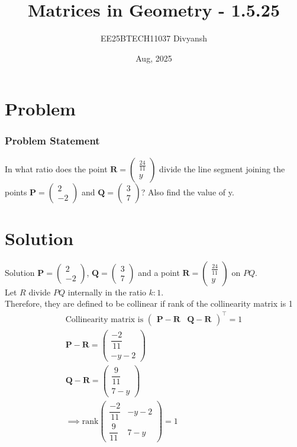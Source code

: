 \documentclass{beamer}
\title{Matrices in Geometry - 1.5.25}
\author{EE25BTECH11037  Divyansh}
\date{Aug, 2025}
\let\vec\mathbf
\theoremstyle{remark}
\newcommand{\myvec}[1]{\ensuremath{\begin{pmatrix}#1\end{pmatrix}}}
\begin{document}
\maketitle


\begin{frame}
\tableofcontents
\end{frame}
\section{Problem}
\begin{frame}
\frametitle{Problem Statement}
In what ratio does the point $\vec{R}=\myvec{\frac{24}{11} \\ y}$ divide the line segment joining the points $\vec{P}=\myvec{2 \\ -2}$ and $\vec{Q}=\myvec{3 \\ 7}$? Also find the value of y.
\end{frame}

\section{Solution}
\begin{frame}{Solution}
   $\vec{P}=\myvec{2\\-2}$, $\vec{Q}=\myvec{3\\7}$ and a point $\vec{R}=  \myvec{\frac{24}{11} \\ y}$ on $PQ$. \\
   Let $R$ divide $PQ$ internally in the ratio $k:1$.\\
   Therefore, they are defined to be collinear if rank of the collinearity matrix is 1
   \begin{align*}
    \text{Collinearity matrix is }\myvec{\vec{P}- \vec{R} & \vec{Q}-\vec{R}}^{\top}=1\\
    \vec{P}-\vec{R}=\myvec{\dfrac{-2}{11} \\ -y-2}\\
    \vec{Q}-\vec{R}=\myvec{\dfrac{9}{11} \\ 7-y}\\
    \implies \text{rank}\myvec{\dfrac{-2}{11} & -y-2 \\ \dfrac{9}{11} & 7-y} = 1
\end{align*}
\end{frame}
\end{document}
